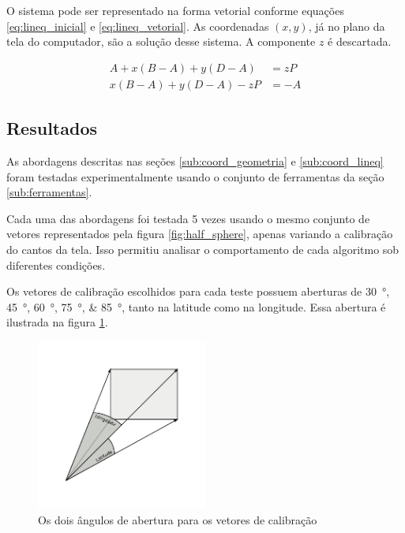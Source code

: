 \documentclass[brazil,pagestart=firstchapter]{abnt}
\begin{document}
O sistema pode ser representado na forma vetorial conforme equações
\eqref{eq:lineq_inicial} e \eqref{eq:lineq_vetorial}. As coordenadas $(x,
y)$, já no plano da tela do computador, são a solução desse sistema. A
componente $z$ é descartada.

\begin{align}
\label{eq:lineq_inicial}
A + x (B-A) + y (D-A) & = z P  \\
\label{eq:lineq_vetorial}
x (B-A) + y (D-A) - z P & = -A
\end{align}



\subsection{Resultados}
\label{sub:coord_resultados}

As abordagens descritas nas seções \ref{sub:coord_geometria} e
\ref{sub:coord_lineq} foram testadas experimentalmente usando o conjunto de
ferramentas da seção \ref{sub:ferramentas}.

Cada uma das abordagens foi testada 5 vezes usando o mesmo conjunto de
vetores representados pela figura \ref{fig:half_sphere}, apenas variando a
calibração do cantos da tela. Isso permitiu analisar o comportamento de cada
algoritmo sob diferentes condições.

Os vetores de calibração escolhidos para cada teste possuem aberturas de
\SIlist{30;45;60;75;85}{\degree}, tanto na latitude como na longitude. Essa
abertura é ilustrada na figura \ref{fig:latitude_longitude}.

\begin{figure}[h]
\centering
\includegraphics[width=0.5\textwidth]{img/latitude_longitude.pdf}
\caption{Os dois ângulos de abertura para os vetores de calibração}
\label{fig:latitude_longitude}
\end{figure}
\end{document}
